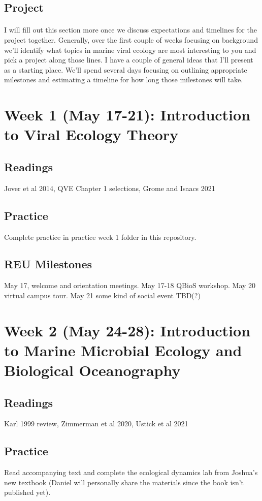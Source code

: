 \documentclass[11pt]{amsart}
\begin{document}
\subsection{Project} 
\paragraph{} I will fill out this section more once we discuss expectations and timelines for the project together. Generally, over the first couple of weeks focusing on background we'll identify what topics in marine viral ecology are most interesting to you and pick a project along those lines. I have a couple of general ideas that I'll present as a starting place. We'll spend several days focusing on outlining appropriate milestones and estimating a timeline for how long those milestones will take. 
\section{Week 1 (May 17-21): Introduction to Viral Ecology Theory}
\subsection{Readings} Jover et al 2014, QVE Chapter 1 selections, Grome and Isaacs 2021
\subsection{Practice} Complete practice in practice week 1 folder in this repository. 
\subsection{REU Milestones} May 17, welcome and orientation meetings. May 17-18 QBioS workshop. May 20 virtual campus tour. May 21 some kind of social event TBD(?)
\section{Week 2 (May 24-28): Introduction to Marine Microbial Ecology and Biological Oceanography}
\subsection{Readings} Karl 1999 review, Zimmerman et al 2020, Ustick et al 2021
\subsection{Practice} Read accompanying text and complete the ecological dynamics lab from Joshua's new textbook (Daniel will personally share the materials since the book isn't published yet). 
\end{document}

